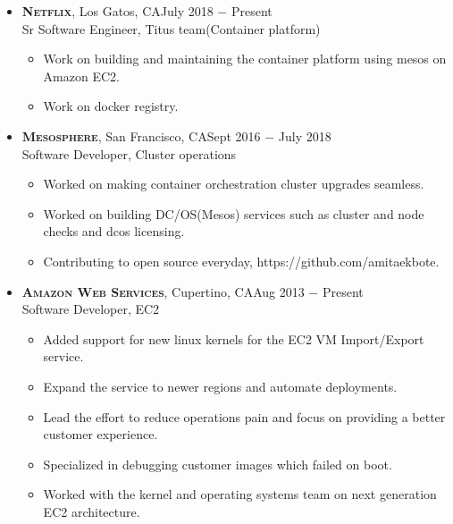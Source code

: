\documentclass[10pt,oneside]{article}
\newcommand{\subheader}[1]{\textsc{\textbf{\large{#1}}}}
\begin{document}
{}
\begin{itemize}
      \item
      \subheader{Netflix}, Los Gatos, CA\hfill July 2018 $-$ Present\\
      Sr Software Engineer, Titus team(Container platform)
      \vspace{-4 pt}
      \begin{itemize}
        \item Work on building and maintaining the container platform using mesos on Amazon EC2.
        \item Work on docker registry. 
      \end{itemize}
  
      \item
      \subheader{Mesosphere}, San Francisco, CA\hfill Sept 2016 $-$ July 2018\\
      Software Developer, Cluster operations
      \vspace{-4 pt}
      \begin{itemize}
        \item Worked on making container orchestration cluster upgrades seamless.
	\item Worked on building DC/OS(Mesos) services such as cluster and node checks and dcos licensing.
        \item Contributing to open source everyday, https://github.com/amitaekbote.
      \end{itemize}
      
    \item	
      \subheader{Amazon Web Services}, Cupertino, CA\hfill Aug 2013 $-$ Present\\
      Software Developer, EC2
      \vspace{-4 pt}
      \begin{itemize}
        \item Added support for new linux kernels for the EC2 VM Import/Export service.
        \item Expand the service to newer regions and automate deployments.
		\item Lead the effort to reduce operations pain and focus on providing a better customer experience.
        \item Specialized in debugging customer images which failed on boot.
        \item Worked with the kernel and operating systems team on next generation EC2 architecture. 
      \end{itemize} 


\end{itemize}
\end{document}
